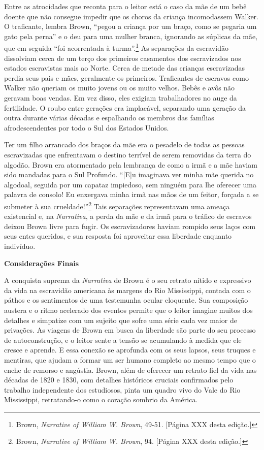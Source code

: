 Entre as atrocidades que reconta para o leitor está o caso da mãe de um
bebê doente que não consegue impedir que os choros da criança
incomodassem Walker. O traficante, lembra Brown, ``pegou a criança por
um braço, como se pegaria um gato pela perna'' e o deu para uma mulher
branca, ignorando as súplicas da mãe, que em seguida ``foi acorrentada à
turma''.\footnote{Brown, \emph{Narrative of William W. Brown}, 49-51.
  {[}Página XXX desta edição.{]}} As separações da escravidão dissolviam
cerca de um terço dos primeiros casamentos dos escravizados nos estados
escravistas mais ao Norte. Cerca de metade das crianças escravizadas
perdia seus pais e mães, geralmente os primeiros. Traficantes de
escravos como Walker não queriam os muito jovens ou os muito velhos.
Bebês e avôs não geravam boas vendas. Em vez disso, eles exigiam
trabalhadores no auge da fertilidade. O roubo entre gerações era
implacável, separando uma geração da outra durante várias décadas e
espalhando os membros das famílias afrodescendentes por todo o Sul dos
Estados Unidos.

Ter um filho arrancado dos braços da mãe era o pesadelo de todas as
pessoas escravizadas que enfrentavam o destino terrível de serem
removidas da terra do algodão. Brown era atormentado pela lembrança de
como a irmã e a mãe haviam sido mandadas para o Sul Profundo. ``{[}E{]}u
imaginava ver minha mãe querida no algodoal, seguida por um capataz
impiedoso, sem ninguém para lhe oferecer uma palavra de consolo! Eu
enxergava minha irmã nas mãos de um feitor, forçada a se submeter à sua
crueldade!''\footnote{Brown, \emph{Narrative of William W. Brown}, 94.
  {[}Página XXX desta edição.{]}} Tais separações representavam uma
ameaça existencial e, na \emph{Narrativa}, a perda da mãe e da irmã para
o tráfico de escravos deixou Brown livre para fugir. Os escravizadores
haviam rompido seus laços com seus entes queridos, e sua resposta foi
aproveitar essa liberdade enquanto indivíduo.

\textbf{Considerações Finais}

A conquista suprema da \emph{Narrativa} de Brown é o seu retrato nítido
e expressivo da vida na escravidão americana às margens do Rio
Mississippi, contada com o páthos e os sentimentos de uma testemunha
ocular eloquente. Sua composição austera e o ritmo acelerado dos eventos
permite que o leitor imagine muitos dos detalhes e simpatize com um
sujeito que sofre uma série cada vez maior de privações. As viagens de
Brown em busca da liberdade são parte do seu processo de autoconstrução,
e o leitor sente a tensão se acumulando à medida que ele cresce e
aprende. E essa conexão se aprofunda com os seus lapsos, seus truques e
mentiras, que ajudam a formar um ser humano completo ao mesmo tempo que
o enche de remorso e angústia. Brown, além de oferecer um retrato fiel
da vida nas décadas de 1820 e 1830, com detalhes históricos cruciais
confirmados pelo trabalho independente dos estudiosos, pinta um quadro
vivo do Vale do Rio Mississippi, retratando-o como o coração sombrio da
América.
